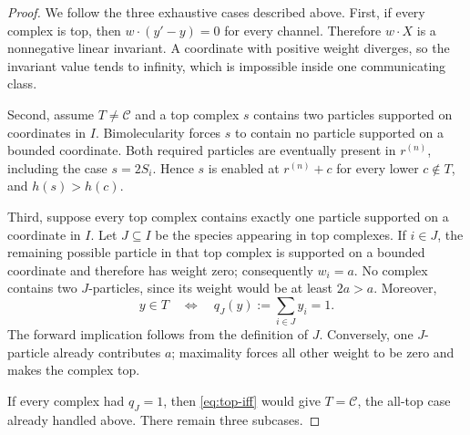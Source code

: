 \begin{proof}
We follow the three exhaustive cases described above.  First, if every
complex is top, then \(w\cdot(y'-y)=0\) for every channel.
Therefore \(w\cdot X\) is a nonnegative linear invariant.  A coordinate with
positive weight diverges, so the invariant value tends to infinity, which is
impossible inside one communicating class.

Second, assume \(T\ne\mathcal C\) and a top complex \(s\) contains two
particles supported on coordinates in \(I\).  Bimolecularity forces \(s\) to
contain no particle supported on a bounded coordinate.  Both required
particles are eventually present in \(r^{(n)}\), including the case
\(s=2S_i\).  Hence \(s\) is enabled at \(r^{(n)}+c\) for every lower
\(c\notin T\), and \(h(s)>h(c)\).

Third, suppose every top complex contains exactly one particle supported on a
coordinate in \(I\).  Let \(J\subseteq I\) be the species appearing in top
complexes.  If \(i\in J\), the remaining possible particle in that top
complex is supported on a bounded coordinate and therefore has weight zero;
consequently \(w_i=a\).  No complex contains two \(J\)-particles, since its
weight would be at least \(2a>a\).  Moreover,
\begin{equation}\label{eq:top-iff}
  y\in T\quad\Longleftrightarrow\quad
  q_J(y):=\sum_{i\in J}y_i=1.
\end{equation}
The forward implication follows from the definition of \(J\).  Conversely,
one \(J\)-particle already contributes \(a\); maximality forces all other
weight to be zero and makes the complex top.

If every complex had \(q_J=1\), then \eqref{eq:top-iff} would give
\(T=\mathcal C\), the all-top case already handled above.  There remain three
subcases.


\end{proof}
